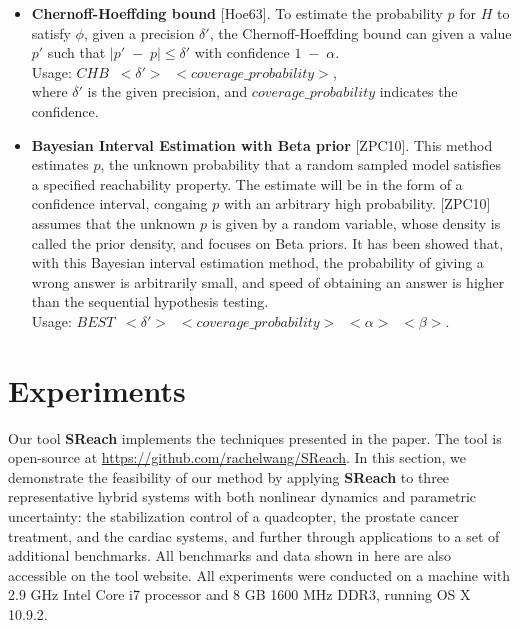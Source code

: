 \documentclass[runningheads,a4paper]{llncs}
\begin{document}
\begin{itemize}

\item {\bf Chernoff-Hoeffding bound} [Hoe63]. To estimate the probability $p$ for $H$ to satisfy $\phi$, given a precision $\delta'$, the Chernoff-Hoeffding bound can given a value $p'$ such that $|p' \; - \; p| \le \delta'$ with confidence $1\;-\; \alpha$.\\
Usage: $CHB\;\; <\delta'> \;\;<coverage\_ probability>$,\\
where $\delta'$ is the given precision, and $coverage\_ probability$ indicates the confidence.\\

\item {\bf Bayesian Interval Estimation with Beta prior} [ZPC10]. This method estimates $p$, the unknown probability that a random sampled model satisfies a specified reachability property. The estimate will be in the form of a confidence interval, congaing $p$ with an arbitrary high probability. [ZPC10] assumes that the unknown $p$ is given by a random variable, whose density is called the prior density, and focuses on Beta priors. It has been showed that, with this Bayesian interval estimation method, the probability of giving a wrong answer is arbitrarily small, and speed of obtaining an answer is higher than the sequential hypothesis testing.\\ Usage: $BEST\;\; <\delta'> \;\;<coverage\_probability>\;\; <\alpha> \;\;<\beta>$.\\
\end{itemize}



\section{Experiments}

Our tool {\bf SReach} implements the techniques presented in the paper. The tool is open-source at \url{https://github.com/rachelwang/SReach}. In this section, we demonstrate the feasibility of our method by applying {\bf SReach} to three representative hybrid systems with both nonlinear dynamics and parametric uncertainty: the stabilization control of a quadcopter, the prostate cancer treatment, and the cardiac systems, and further through applications to a set of additional benchmarks. All benchmarks and data shown in here are also accessible on the tool website. All experiments were conducted on a machine with 2.9 GHz Intel Core i7 processor and 8 GB 1600 MHz DDR3, running OS X 10.9.2.
\end{document}
